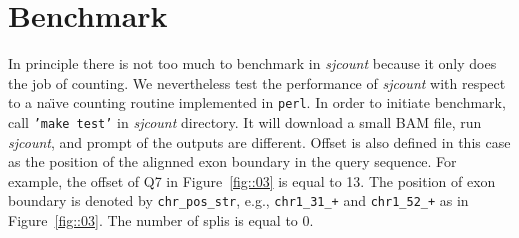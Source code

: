 \documentclass{article}
\begin{document}
\section{Benchmark}
In principle there is not too much to benchmark in {\em sjcount} because it only does the job of counting.
We nevertheless test the performance of {\em sjcount} with respect to a na{\"\i}ve counting routine 
implemented in {\tt perl}. In order to initiate benchmark, call {\tt 'make test'} in {\em sjcount} directory.
It will download a small BAM file, run {\em sjcount}, and prompt of the outputs are different. Offset is 
also defined in this case as the position of the alignned exon boundary in the query sequence. For example,
the offset of Q7 in Figure~\ref{fig::03} is equal to 13. The position of exon boundary is denoted by {\tt chr\_pos\_str}, 
e.g., {\tt chr1\_31\_+} and {\tt chr1\_52\_+} as in Figure~\ref{fig::03}. The number of splis is equal to 0.



\end{document}
